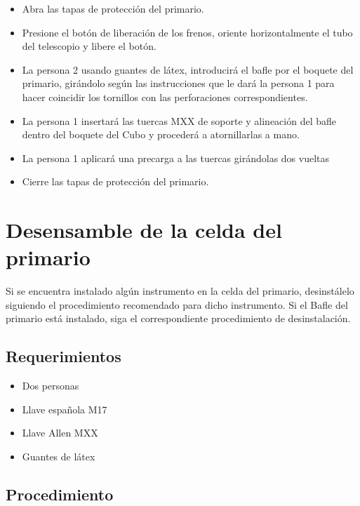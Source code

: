 \begin{itemize}
\item Abra las tapas de protección del primario. 
\item Presione el botón de liberación de los frenos, oriente horizontalmente el tubo del telescopio y libere el botón. 
\item La persona 2 usando guantes de látex, introducirá el bafle por el boquete del primario, girándolo según las instrucciones que le dará la persona 1 para hacer coincidir los tornillos con las perforaciones correspondientes. 
\item La persona 1 insertará las tuercas MXX de soporte y alineación del bafle dentro del boquete del Cubo y procederá a atornillarlas a mano. 
\item La persona 1 aplicará una precarga a las tuercas girándolas dos vueltas
\item Cierre las tapas de protección del primario.
\end{itemize}

\section{Desensamble de la celda del primario}

Si se encuentra instalado algún instrumento en la celda del primario, desinstálelo siguiendo el procedimiento recomendado para dicho instrumento.
Si el Bafle del primario está instalado, siga el correspondiente procedimiento de desinstalación. 

\subsection{Requerimientos}

\begin{itemize}
\item Dos personas
\item Llave española M17
\item Llave Allen MXX 
\item Guantes de látex
\end{itemize}

\subsection{Procedimiento}

